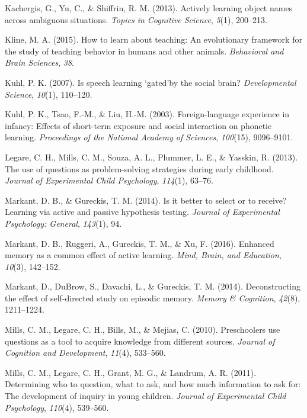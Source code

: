 \documentclass[a4paper,man,apacite,floatsintext]{apa6}
\begin{document}
\hypertarget{ref-kachergis2013actively}{}
Kachergis, G., Yu, C., \& Shiffrin, R. M. (2013). Actively learning
object names across ambiguous situations. \emph{Topics in Cognitive
Science}, \emph{5}(1), 200--213.

\hypertarget{ref-kline2015learn}{}
Kline, M. A. (2015). How to learn about teaching: An evolutionary
framework for the study of teaching behavior in humans and other
animals. \emph{Behavioral and Brain Sciences}, \emph{38}.

\hypertarget{ref-kuhl2007speech}{}
Kuhl, P. K. (2007). Is speech learning `gated'by the social brain?
\emph{Developmental Science}, \emph{10}(1), 110--120.

\hypertarget{ref-kuhl2003foreign}{}
Kuhl, P. K., Tsao, F.-M., \& Liu, H.-M. (2003). Foreign-language
experience in infancy: Effects of short-term exposure and social
interaction on phonetic learning. \emph{Proceedings of the National
Academy of Sciences}, \emph{100}(15), 9096--9101.

\hypertarget{ref-legare2013use}{}
Legare, C. H., Mills, C. M., Souza, A. L., Plummer, L. E., \& Yasskin,
R. (2013). The use of questions as problem-solving strategies during
early childhood. \emph{Journal of Experimental Child Psychology},
\emph{114}(1), 63--76.

\hypertarget{ref-markant2014better}{}
Markant, D. B., \& Gureckis, T. M. (2014). Is it better to select or to
receive? Learning via active and passive hypothesis testing.
\emph{Journal of Experimental Psychology: General}, \emph{143}(1), 94.

\hypertarget{ref-markant2016enhanced}{}
Markant, D. B., Ruggeri, A., Gureckis, T. M., \& Xu, F. (2016). Enhanced
memory as a common effect of active learning. \emph{Mind, Brain, and
Education}, \emph{10}(3), 142--152.

\hypertarget{ref-markant2014deconstructing}{}
Markant, D., DuBrow, S., Davachi, L., \& Gureckis, T. M. (2014).
Deconstructing the effect of self-directed study on episodic memory.
\emph{Memory \& Cognition}, \emph{42}(8), 1211--1224.

\hypertarget{ref-mills2010preschoolers}{}
Mills, C. M., Legare, C. H., Bills, M., \& Mejias, C. (2010).
Preschoolers use questions as a tool to acquire knowledge from different
sources. \emph{Journal of Cognition and Development}, \emph{11}(4),
533--560.

\hypertarget{ref-mills2011determining}{}
Mills, C. M., Legare, C. H., Grant, M. G., \& Landrum, A. R. (2011).
Determining who to question, what to ask, and how much information to
ask for: The development of inquiry in young children. \emph{Journal of
Experimental Child Psychology}, \emph{110}(4), 539--560.
\end{document}
